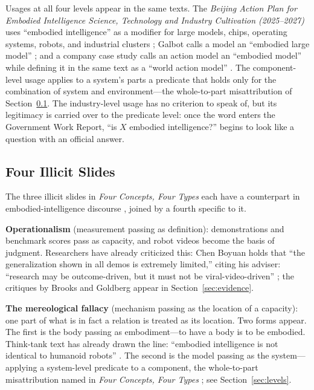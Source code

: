 \documentclass[10pt]{article}
\begin{document}
Usages at all four levels appear in the same texts. The \textit{Beijing Action Plan for Embodied Intelligence Science, Technology and Industry Cultivation (2025--2027)} uses ``embodied intelligence'' as a modifier for large models, chips, operating systems, robots, and industrial clusters \cite{beijing2025}; Galbot calls a model an ``embodied large model'' \cite{galbot}; and a company case study calls an action model an ``embodied model'' while defining it in the same text as a ``world action model'' \cite{liberai2026}. The component-level usage applies to a system's parts a predicate that holds only for the combination of system and environment---the whole-to-part misattribution of Section~\ref{sec:slides}. The industry-level usage has no criterion to speak of, but its legitimacy is carried over to the predicate level: once the word enters the Government Work Report, ``is $X$ embodied intelligence?'' begins to look like a question with an official answer.

\subsection{Four Illicit Slides}\label{sec:slides}

The three illicit slides in \textit{Four Concepts, Four Types} each have a counterpart in embodied-intelligence discourse \cite{yu2026four}, joined by a fourth specific to it.

\textbf{Operationalism} (measurement passing as definition): demonstrations and benchmark scores pass as capacity, and robot videos become the basis of judgment. Researchers have already criticized this: Chen Boyuan holds that ``the generalization shown in all demos is extremely limited,'' citing his adviser: ``research may be outcome-driven, but it must not be viral-video-driven'' \cite{chenby2024}; the critiques by Brooks and Goldberg appear in Section~\ref{sec:evidence}.

\textbf{The mereological fallacy} (mechanism passing as the location of a capacity): one part of what is in fact a relation is treated as its location. Two forms appear. The first is the body passing as embodiment---to have a body is to be embodied. Think-tank text has already drawn the line: ``embodied intelligence is not identical to humanoid robots'' \cite{caict2024}. The second is the model passing as the system---applying a system-level predicate to a component, the whole-to-part misattribution named in \textit{Four Concepts, Four Types} \cite{yu2026four}; see Section~\ref{sec:levels}.
\end{document}
